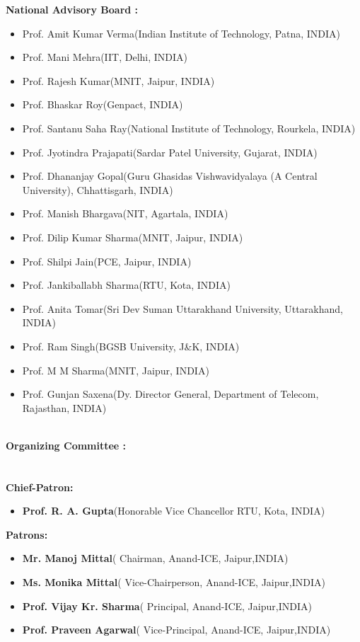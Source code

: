 \documentclass[twoside,11pt]{amsart}
\begin{document}
\newpage
\vskip 10mm
{\Large \bf National Advisory Board : }
\\
\begin{itemize}
\item Prof. Amit Kumar Verma(Indian Institute of Technology, Patna, INDIA)
\item Prof. Mani Mehra(IIT, Delhi, INDIA)
\item Prof. Rajesh Kumar(MNIT, Jaipur, INDIA)
\item Prof. Bhaskar Roy(Genpact, INDIA)
\item Prof. Santanu Saha Ray(National Institute of Technology, Rourkela, INDIA)
\item Prof. Jyotindra Prajapati(Sardar Patel University, Gujarat, INDIA)
\item Prof. Dhananjay Gopal(Guru Ghasidas Vishwavidyalaya (A Central University), Chhattisgarh, INDIA)
\item Prof. Manish Bhargava(NIT, Agartala, INDIA)
\item Prof. Dilip Kumar Sharma(MNIT, Jaipur, INDIA)
\item Prof. Shilpi Jain(PCE, Jaipur, INDIA)
\item Prof. Jankiballabh Sharma(RTU, Kota, INDIA)
\item Prof. Anita Tomar(Sri Dev Suman Uttarakhand University, Uttarakhand, INDIA)
\item Prof. Ram Singh(BGSB University, J\&K, INDIA)
\item Prof. M M Sharma(MNIT, Jaipur, INDIA)
\item Prof. Gunjan Saxena(Dy. Director General, Department of Telecom, Rajasthan, INDIA)
\end{itemize}
\noindent
\\
{\Large \bf Organizing Committee  : }
\\
\\
\\
\noindent
{\Large \bf Chief-Patron: }
\vskip 5mm
\begin{itemize}
\item \textbf{Prof. R. A. Gupta}(Honorable Vice Chancellor RTU, Kota, INDIA)
\end{itemize}
\vskip 5mm
\noindent
{\Large \bf Patrons: }
\vskip 5mm
\begin{itemize}
\item \textbf{Mr. Manoj Mittal}( Chairman, Anand-ICE, Jaipur,INDIA)
\item  \textbf{Ms. Monika Mittal}( Vice-Chairperson, Anand-ICE, Jaipur,INDIA)
\item \textbf{ Prof. Vijay Kr. Sharma}( Principal, Anand-ICE, Jaipur,INDIA)
\item \textbf{Prof. Praveen Agarwal}( Vice-Principal, Anand-ICE, Jaipur,INDIA)
\end{itemize}
\end{document}

